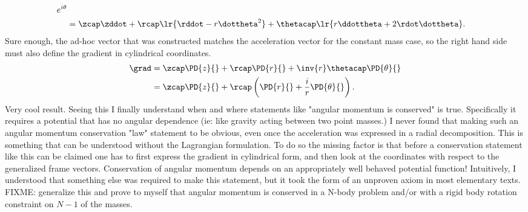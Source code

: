 {\begin{equation}
\begin{aligned}
 e^{i\theta} \\
           &= \zcap \zddot + \rcap
\lr{ \rddot - r \dottheta^2 }
 + \thetacap
\lr{ r \ddottheta + 2 \rdot \dottheta } .
\end{aligned}
\end{equation}
%
Sure enough, the ad-hoc vector that was constructed matches the acceleration vector for the constant mass case, so the right hand side must also define the gradient
in cylindrical coordinates.
%
\begin{equation}\label{eqn:tongMf1:760}
\begin{aligned}
\grad
&= \zcap \PD{z}{} + \rcap \PD{r}{} + \inv{r} \thetacap \PD{\theta}{} \\
&= \zcap \PD{z}{} + \rcap \left(\PD{r}{} + \frac{i}{r} \PD{\theta}{} \right).
\end{aligned}
\end{equation}
%
Very cool result.  Seeing this I finally understand when and where statements like "angular momentum is conserved" is true.  Specifically it requires a potential that has no angular dependence (ie: like gravity acting between two point masses.)
%
I never found that making such an angular momentum conservation "law" statement to be obvious, even once the acceleration was expressed in a radial decomposition.  This is something that can be understood without the Lagrangian formulation.  To do so the missing factor is that before a conservation statement like this can be claimed one has to first express the gradient in cylindrical form, and then look at the coordinates with respect to the generalized frame vectors.  Conservation of angular momentum depends on an appropriately well behaved potential function!  Intuitively, I understood that something else was required to make this statement, but it took the form of an unproven axiom in most elementary texts.
%
FIXME: generalize this and prove to myself that angular momentum is conserved in a N-body problem and/or with a rigid body rotation constraint on \(N-1\) of the masses.
%
}
